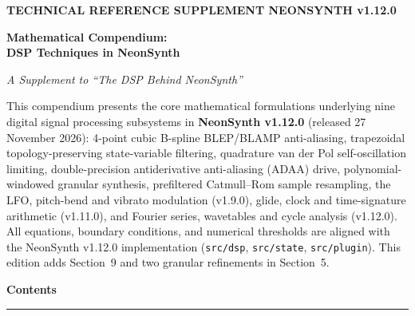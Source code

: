 \documentclass[11pt,letterpaper]{article}
\newcommand{\NSVersion}{1.12.0}
\newcommand{\NSDate}{27 November 2026}
\newcommand{\code}[1]{\texttt{\textcolor{codegray}{#1}}}
\begin{document}
\thispagestyle{titlepage}

\begin{tcolorbox}[colback=navy, colframe=accent, boxrule=0pt, bottomrule=3pt,
                  arc=4pt, outer arc=4pt, left=20pt, right=20pt, top=14pt, bottom=16pt]
  {\sffamily\bfseries\footnotesize\textcolor{kicker}{TECHNICAL REFERENCE SUPPLEMENT \textbullet{} NEONSYNTH v\NSVersion}}\par
  \vspace{2pt}
  {\sffamily\bfseries\fontsize{24}{27}\selectfont\color{white}Mathematical Compendium:\\DSP Techniques in NeonSynth\par}
  \vspace{8pt}
  {\itshape\large\textcolor{white!85!navy}{A Supplement to ``The DSP Behind NeonSynth''}\par}
\end{tcolorbox}

\vspace{0.08in}

\begin{tcolorbox}[colback=boxbg, colframe=accent, coltitle=accent, colbacktitle=boxbg,
                  boxrule=0pt, leftrule=3.5pt, arc=0pt, outer arc=0pt,
                  left=10pt, right=8pt, top=3pt, bottom=7pt, toptitle=5pt, bottomtitle=2pt,
                  titlerule=0pt, fonttitle=\sffamily\bfseries\small, title={Scope \& Edition Notes}]
This compendium presents the core mathematical formulations underlying nine digital signal processing
subsystems in \textbf{NeonSynth v\NSVersion} (released \NSDate): 4-point cubic B-spline BLEP/BLAMP
anti-aliasing, trapezoidal topology-preserving state-variable filtering, quadrature van der Pol self-oscillation
limiting, double-precision antiderivative anti-aliasing (ADAA) drive, polynomial-windowed granular synthesis,
prefiltered Catmull--Rom sample resampling, the LFO, pitch-bend and vibrato modulation (v1.9.0),
glide, clock and time-signature arithmetic (v1.11.0), and Fourier series,
wavetables and cycle analysis (v1.12.0).\\
All equations, boundary conditions, and numerical thresholds are aligned with the NeonSynth v\NSVersion{} implementation
(\code{src/dsp}, \code{src/state}, \code{src/plugin}). This edition adds Section~9 and two granular refinements in Section~5.
\end{tcolorbox}

\vspace{0.04in}
{\sffamily\bfseries\large\color{navy}Contents\par}
\vspace{2pt}
{\color{accent}\hrule height 0.8pt}
\vspace{3pt}
\end{document}
